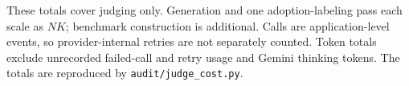 These totals cover judging only. Generation and one adoption-labeling pass each scale as $NK$; benchmark construction is additional. Calls are application-level events, so provider-internal retries are not separately counted. Token totals exclude unrecorded failed-call and retry usage and Gemini thinking tokens. The totals are reproduced by \texttt{audit/judge\_cost.py}.

